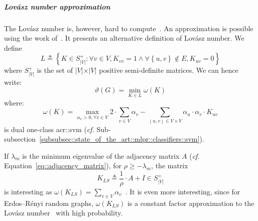                 \subparagraph{Lov\'asz number approximation}
                    The Lov\'asz number is, however, hard to compute~\parencite{johansson2014global}.
                    An approximation is possible using the work of~\textcite{jethava2013lovasz}.
                    It presents an alternative definition of Lov\'asz number.
                    We define $$L \triangleq \left\{K \in S_{\vert V \vert}^+: \forall v \in V, K_{vv} = 1 \wedge \forall \left\{u, v\right\}  \notin E, K_{uv} = 0\right\}$$ where $S_{\vert V \vert}^+$ is the set of $\vert V \vert \times \vert V \vert$ positive semi-definite matrices.
                    We can hence write:
                    \begin{equation}
                        \label{eq::lovazs_number_alternative}
                        \vartheta(G) = \min_{K \in L} \omega(K)
                    \end{equation}
                    where:
                    \begin{equation}
                        \omega(K) = \max_{\alpha_v > 0, \forall v \in V} 2\cdot \sum_{v\in V} \alpha_v - \sum_{(u, v) \in V\times V} \alpha_u \cdot \alpha_v \cdot K_{uv}
                    \end{equation}
                    is dual one-class \gls{acr::svm} (\textit{cf.} Sub-subsection~\ref{subsubsec::state_of_the_art::mlpr::classifiers::svm}).

                    If $\lambda_m$ is the minimum eigenvalue of the adjacency matrix $A$ (\textit{cf.} Equation~\ref{eq::adjacency_matrix}), for $\rho\geq-\lambda_m$, the matrix
                    \begin{equation}
                        \label{eq::ls_matrix}
                        K_{LS} \triangleq \frac{1}{\rho} \cdot A + I \in S_{\vert V \vert}^+
                    \end{equation}
                    is interesting as $\omega(K_{LS}) = \sum_{v\in V} \alpha_v$~\parencite{jethava2013lovasz}.
                    It is even more interesting, since for Erdos–R\'enyi random graphs, $\omega(K_{LS})$ is a constant factor approximation to the Lov\'asz number~\parencite{jethava2013lovasz} with high probability.

